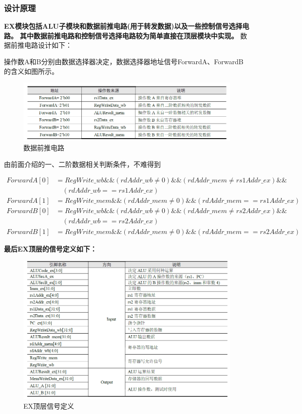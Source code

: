 \documentclass[12pt,hyperref,a4paper,UTF8]{ctexart}
\begin{document}
\subsubsection*{\Large 设计原理}
\normalsize

\textbf{EX模块包括ALU子模块和数据前推电路(用于转发数据)以及一些控制信号选择电路。}
\textbf{其中数据前推电路和控制信号选择电路较为简单直接在顶层模块中实现。}
数据前推电路设计如下：

操作数A和B分别由数据选择器决定，数据选择器地址信号ForwardA、ForwardB的含义如图所示。
    \begin{figure}[H]
        \centering
        \includegraphics[width=1\textwidth]{figures/fig/image11.png}
        \caption{数据前推电路}
    \end{figure}
由前面介绍的一、二阶数据相关判断条件，不难得到

\begin{align*}
ForwardA[0] &= RegWrite\_wb \&\& (rdAddr\_wb \neq 0) \&\& (rdAddr\_mem \neq rs1Addr\_ex) \&\& \nonumber \\
&\quad (rdAddr\_wb == rs1Addr\_ex) \\
ForwardA[1] &= RegWrite\_mem \&\& (rdAddr\_mem \neq 0) \&\& (rdAddr\_mem == rs1Addr\_ex) \\
ForwardB[0] &= RegWrite\_wb \&\& (rdAddr\_wb \neq 0) \&\& (rdAddr\_mem \neq rs2Addr\_ex) \&\& \nonumber \\
&\quad (rdAddr\_wb == rs2Addr\_ex) \\
ForwardB[1] &= RegWrite\_mem \&\& (rdAddr\_mem \neq 0) \&\& (rdAddr\_mem == rs2Addr\_ex)
\end{align*}
  

\textbf{最后EX顶层的信号定义如下：}
    \begin{figure}[H]
        \centering
        \includegraphics[width=1\textwidth]{figures/fig/image12.png}
        \caption{EX顶层信号定义}
    \end{figure}
\end{document}
